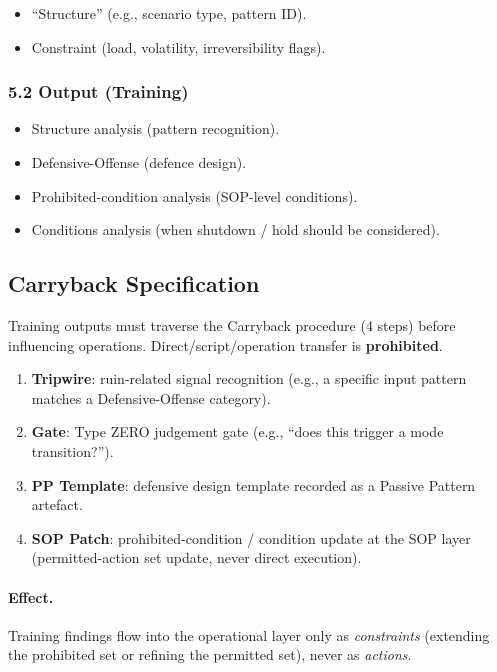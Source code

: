 \begin{itemize}
\item ``Structure'' (e.g., scenario type, pattern ID).
\item Constraint (load, volatility, irreversibility flags).
\end{itemize}

\subsubsection{5.2 Output (Training)}
\label{sec:training-v18-output}

\begin{itemize}
\item Structure analysis (pattern recognition).
\item Defensive-Offense (defence design).
\item Prohibited-condition analysis (SOP-level conditions).
\item Conditions analysis (when shutdown / hold should be
considered).
\end{itemize}

\subsection{Carryback Specification}
\label{sec:carryback-spec}

Training outputs must traverse the Carryback procedure (4 steps)
before influencing operations. Direct/script/operation transfer is
\textbf{prohibited}.

\begin{enumerate}
\item \textbf{Tripwire}: ruin-related signal recognition (e.g., a
specific input pattern matches a Defensive-Offense category).
\item \textbf{Gate}: Type ZERO judgement gate (e.g., ``does this
trigger a mode transition?'').
\item \textbf{PP Template}: defensive design template recorded as a
Passive Pattern artefact.
\item \textbf{SOP Patch}: prohibited-condition / condition update at
the SOP layer (permitted-action set update, never direct execution).
\end{enumerate}

\paragraph{Effect.}
Training findings flow into the operational layer only as
\emph{constraints} (extending the prohibited set or refining the
permitted set), never as \emph{actions}.

